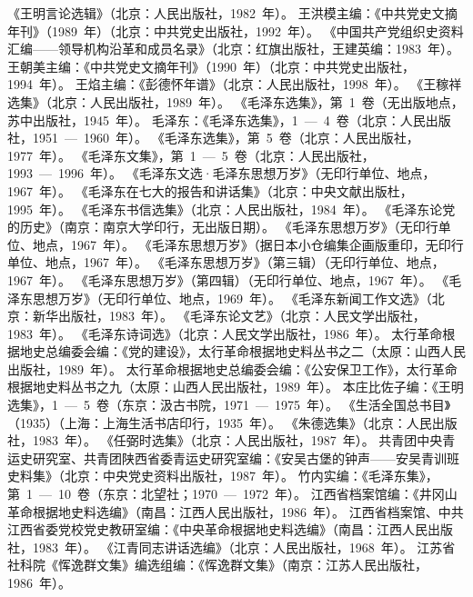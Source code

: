 \begin{thebibliography}{999}
\bibitem{}《王明言论选辑》（北京：人民出版社，1982~年）。
\bibitem{}王洪模主编：《中共党史文摘年刊》（1989~年）（北京：中共党史出版社，1992~年）。
\bibitem{}《中国共产党组织史资料汇编——领导机构沿革和成员名录》（北京：红旗出版社，王建英编：1983~年）。
\bibitem{}王朝美主编：《中共党史文摘年刊》（1990~年）（北京：中共党史出版社，1994~年）。
\bibitem{}王焰主编：《彭德怀年谱》（北京：人民出版社，1998~年）。
\bibitem{}《王稼祥选集》（北京：人民出版社，1989~年）。
\bibitem{}《毛泽东选集》，第~1~卷（无出版地点，苏中出版社，1945~年）。
\bibitem{}毛泽东：《毛泽东选集》，1~—~4~卷（北京：人民出版社，1951~—~1960~年）。
\bibitem{}《毛泽东选集》，第~5~卷（北京：人民出版社，1977~年）。
\bibitem{}《毛泽东文集》，第~1~—~5~卷（北京：人民出版社，1993~—~1996~年）。
\bibitem{}《毛泽东文选·毛泽东思想万岁》（无印行单位、地点，1967~年）。
\bibitem{}《毛泽东在七大的报告和讲话集》（北京：中央文献出版杜，1995~年）。
\bibitem{}《毛泽东书信选集》（北京：人民出版社，1984~年）。
\bibitem{}《毛泽东论党的历史》（南京：南京大学印行，无出版日期）。
\bibitem{}《毛泽东思想万岁》（无印行单位、地点，1967~年）。
\bibitem{}《毛泽东思想万岁》（据日本小仓编集企画版重印，无印行单位、地点，1967~年）。
\bibitem{}《毛泽东思想万岁》（第三辑）（无印行单位、地点，1967~年）。
\bibitem{}《毛泽东思想万岁》（第四辑）（无印行单位、地点，1967~年）。
\bibitem{}《毛泽东思想万岁》（无印行单位、地点，1969~年）。
\bibitem{}《毛泽东新闻工作文选》（北京：新华出版社，1983~年）。
\bibitem{}《毛泽东论文艺》（北京：人民文学出版社，1983~年）。
\bibitem{}《毛泽东诗词选》（北京：人民文学出版社，1986~年）。
\bibitem{}太行革命根据地史总编委会编：《党的建设》，太行革命根据地史料丛书之二（太原：山西人民出版社，1989~年）。
\bibitem{}太行革命根据地史总编委会编：《公安保卫工作》，太行革命根据地史料丛书之九（太原：山西人民出版社，1989~年）。
\bibitem{}本庄比佐子编：《王明选集》，1~—~5~卷（东京：汲古书院，1971~—~1975~年）。
\bibitem{}《生活全国总书目》（1935）（上海：上海生活书店印行，1935~年）。
\bibitem{}《朱德选集》（北京：人民出版社，1983~年）。
\bibitem{}《任弼时选集》（北京：人民出版社，1987~年）。
\bibitem{}共青团中央青运史研究室、共青团陕西省委青运史研究室编：《安吴古堡的钟声——安吴青训班史料集》（北京：中央党史资料出版社，1987~年）。
\bibitem{}竹内实编：《毛泽东集》，第~1~—~10~卷（东京：北望社；1970~—~1972~年）。
\bibitem{}江西省档案馆编：《井冈山革命根据地史料选编》（南昌：江西人民出版社，1986~年）。
\bibitem{}江西省档案馆、中共江西省委党校党史教研室编：《中央革命根据地史料选编》（南昌：江西人民出版社，1983~年）。
\bibitem{}《江青同志讲话选编》（北京：人民出版社，1968~年）。
\bibitem{}江苏省社科院《恽逸群文集》编选组编：《恽逸群文集》（南京：江苏人民出版社，1986~年）。

\end{thebibliography}
